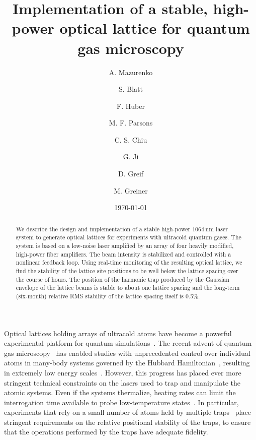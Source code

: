 \documentclass[twocolumn,aip,rsi,reprint,bibnotes]{revtex4-1}
\newcommand\unit[2]{\ensuremath{#1~\mathrm{{#2}}}}
\begin{document}
\title{Implementation of a stable, high-power optical lattice for quantum gas microscopy}

\author{A. Mazurenko}
\author{S. Blatt}
\author{F. Huber}
\author{M. F. Parsons}
\author{C. S. Chiu}
\author{G. Ji}
\author{D. Greif}
\author{M. Greiner}

\date{\today}
\begin{abstract}
We describe the design and implementation of a stable high-power \unit{1064}{nm} laser system to generate optical lattices for experiments with ultracold quantum gases. The system is based on a low-noise laser amplified by an array of four heavily modified, high-power fiber amplifiers. The beam intensity is stabilized and controlled with a nonlinear feedback loop.
Using real-time monitoring of the resulting optical lattice, we find the stability of the lattice site positions to be well below the lattice spacing over the course of hours.
The position of the harmonic trap produced by the Gaussian envelope of the lattice beams is stable to about one lattice spacing and the long-term (six-month) relative RMS stability of the lattice spacing itself is 0.5\%.
\end{abstract}
\maketitle

Optical lattices holding arrays of ultracold atoms have become a powerful experimental platform for quantum simulations~\cite{Friedenauer2008, Kim2010, Struck2011, Simon2011, Yan2013, Greif2013, Murmann2015, Drewes2017}.
The recent advent of quantum gas microscopy~\cite{Bakr2009, Sherson2010, Haller2015, Cheuk2015, Parsons2015, Edge2015, Omran2015, Greif2016, Cheuk2016, Parsons2016, Boll2016, Cheuk2016a, Brown2017} has enabled studies with unprecedented control over individual atoms in many-body systems governed by the Hubbard Hamiltonian~\cite{Hubbard1963}, resulting in extremely low energy scales~\cite{Mazurenko2017, Chiu2018}.
However, this progress has placed ever more stringent technical constraints on the lasers used to trap and manipulate the atomic systems.
Even if the systems thermalize, heating rates can limit the interrogation time available to probe low-temperature states~\cite{Blatt2015}.
In particular, experiments that rely on a small number of atoms held by multiple traps~\cite{Preiss2015, Choi2016, Mazurenko2017, Chiu2018} place stringent requirements on the relative positional stability of the traps, to ensure that the operations performed by the traps have adequate fidelity.
\end{document}

